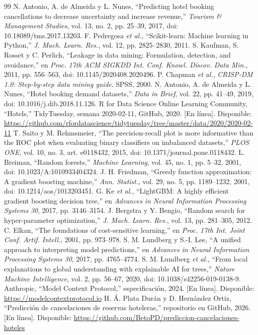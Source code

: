 \documentclass[conference]{IEEEtran}
\begin{document}
\begin{thebibliography}{99}
 N. Antonio, A. de Almeida y L. Nunes, ``Predicting hotel booking cancellations to decrease uncertainty and increase revenue,'' \emph{Tourism \& Management Studies}, vol. 13, no. 2, pp. 25--39, 2017, doi: 10.18089/tms.2017.13203.
 F. Pedregosa \emph{et al.}, ``Scikit-learn: Machine learning in Python,'' \emph{J. Mach. Learn. Res.}, vol. 12, pp. 2825--2830, 2011.
 S. Kaufman, S. Rosset y C. Perlich, ``Leakage in data mining: Formulation, detection, and avoidance,'' en \emph{Proc. 17th ACM SIGKDD Int. Conf. Knowl. Discov. Data Min.}, 2011, pp. 556--563, doi: 10.1145/2020408.2020496.
 P. Chapman \emph{et al.}, \emph{CRISP-DM 1.0: Step-by-step data mining guide}. SPSS, 2000.
 N. Antonio, A. de Almeida y L. Nunes, ``Hotel booking demand datasets,'' \emph{Data in Brief}, vol. 22, pp. 41--49, 2019, doi: 10.1016/j.dib.2018.11.126.
 R for Data Science Online Learning Community, ``Hotels,'' TidyTuesday, semana 2020-02-11, GitHub, 2020. [En línea]. Disponible: \url{https://github.com/rfordatascience/tidytuesday/tree/master/data/2020/2020-02-11}
 T. Saito y M. Rehmsmeier, ``The precision-recall plot is more informative than the ROC plot when evaluating binary classifiers on imbalanced datasets,'' \emph{PLOS ONE}, vol. 10, no. 3, art. e0118432, 2015, doi: 10.1371/journal.pone.0118432.
 L. Breiman, ``Random forests,'' \emph{Machine Learning}, vol. 45, no. 1, pp. 5--32, 2001, doi: 10.1023/A:1010933404324.
 J. H. Friedman, ``Greedy function approximation: A gradient boosting machine,'' \emph{Ann. Statist.}, vol. 29, no. 5, pp. 1189--1232, 2001, doi: 10.1214/aos/1013203451.
 G. Ke \emph{et al.}, ``LightGBM: A highly efficient gradient boosting decision tree,'' en \emph{Advances in Neural Information Processing Systems 30}, 2017, pp. 3146--3154.
 J. Bergstra y Y. Bengio, ``Random search for hyper-parameter optimization,'' \emph{J. Mach. Learn. Res.}, vol. 13, pp. 281--305, 2012.
 C. Elkan, ``The foundations of cost-sensitive learning,'' en \emph{Proc. 17th Int. Joint Conf. Artif. Intell.}, 2001, pp. 973--978.
 S. M. Lundberg y S.-I. Lee, ``A unified approach to interpreting model predictions,'' en \emph{Advances in Neural Information Processing Systems 30}, 2017, pp. 4765--4774.
 S. M. Lundberg \emph{et al.}, ``From local explanations to global understanding with explainable AI for trees,'' \emph{Nature Machine Intelligence}, vol. 2, pp. 56--67, 2020, doi: 10.1038/s42256-019-0138-9.
 Anthropic, ``Model Context Protocol,'' especificación, 2024. [En línea]. Disponible: \url{https://modelcontextprotocol.io}
 H. Á. Plata Durán y D. Hernández Ortiz, ``Predicción de cancelaciones de reservas hoteleras,'' repositorio en GitHub, 2026. [En línea]. Disponible: \url{https://github.com/BetoPD/prediccion-cancelaciones-hoteles}
\end{thebibliography}
\end{document}
